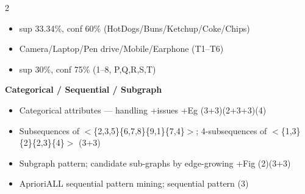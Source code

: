 \documentclass[10pt]{article}
\begin{document}
\begin{multicols}{2}
\begin{itemize}
\begin{itemize}
      \item sup 33.34\%, conf 60\% (HotDogs/Buns/Ketchup/Coke/Chips)
      \item Camera/Laptop/Pen drive/Mobile/Earphone (T1--T6)
      \item sup 30\%, conf 75\% (1--8, P,Q,R,S,T)
    \end{itemize}
\end{itemize}
\textbf{Categorical / Sequential / Subgraph}
\begin{itemize}
  \item Categorical attributes --- handling +issues +Eg \hfill (3+3)(2+3+3)(4)
  \item Subsequences of $<$\{2,3,5\}\{6,7,8\}\{9,1\}\{7,4\}$>$; 4-subsequences of $<$\{1,3\}\{2\}\{2,3\}\{4\}$>$ \hfill (3+3)
  \item Subgraph pattern; candidate sub-graphs by edge-growing +Fig \hfill (2)(3+3)
  \item AprioriALL sequential pattern mining; sequential pattern \hfill (3)
\end{itemize}


\end{multicols}
\end{document}
